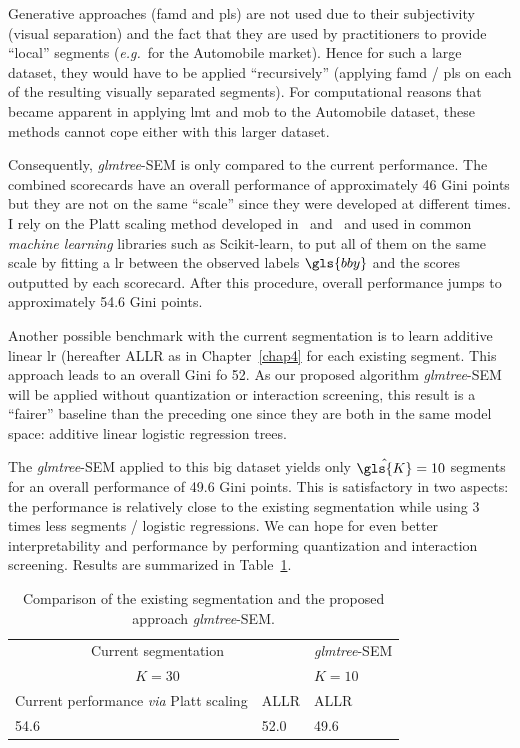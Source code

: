 Generative approaches (\gls{famd} and \gls{pls}) are not used due to their subjectivity (visual separation) and the fact that they are used by practitioners to provide ``local'' segments (\textit{e.g.}\ for the Automobile market). Hence for such a large dataset, they would have to be applied ``recursively'' (applying \gls{famd} / \gls{pls} on each of the resulting visually separated segments). For computational reasons that became apparent in applying \gls{lmt} and \gls{mob} to the Automobile dataset, these methods cannot cope either with this larger dataset.

Consequently, \textit{glmtree}-SEM is only compared to the current performance. The combined scorecards have an overall performance of approximately 46 Gini points but they are not on the same ``scale'' since they were developed at different times. I rely on the Platt scaling method developed in~\cite{platt1999probabilistic} and~\cite{zadrozny2002transforming} and used in common \textit{machine learning} libraries such as Scikit-learn, to put all of them on the same scale by fitting a \gls{lr} between the observed labels $\gls{bby}$ and the scores outputted by each scorecard. After this procedure, overall performance jumps to approximately 54.6 Gini points.

Another possible benchmark with the current segmentation is to learn additive linear \gls{lr} (hereafter ALLR as in Chapter~\ref{chap4} for each existing segment. This approach leads to an overall Gini fo 52. As our proposed algorithm \textit{glmtree}-SEM will be applied without quantization or interaction screening, this result is a ``fairer'' baseline than the preceding one since they are both in the same model space: additive linear logistic regression trees.

The \textit{glmtree}-SEM applied to this big dataset yields only $\hat{\gls{K}} = 10$ segments for an overall performance of 49.6 Gini points. This is satisfactory in two aspects: the performance is relatively close to the existing segmentation while using 3 times less segments / logistic regressions. We can hope for even better interpretability and performance by performing quantization and interaction screening. Results are summarized in Table~\ref{tab:res_tot_trees}.

\begin{table}[t]
\caption{\label{tab:res_tot_trees} Comparison of the existing segmentation and the proposed approach \textit{glmtree}-SEM.}
\centering
\begin{tabular}{l|l|l}
\multicolumn{2}{c|}{Current segmentation} & \textit{glmtree}-SEM \\
\multicolumn{2}{c|}{$K = 30$} & $K = 10$ \\
\hline
Current performance \textit{via} Platt scaling & ALLR & ALLR \\
\hline
54.6 & 52.0 & 49.6 \\
\end{tabular}
\end{table}


